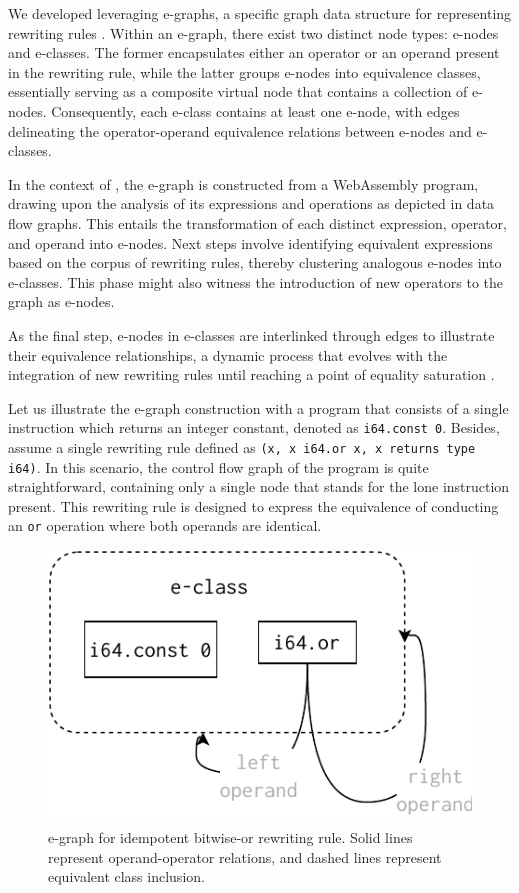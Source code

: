 \label{alg}

We developed \tool leveraging e-graphs, a specific graph data structure for representing rewriting rules \cite{10.1145/3571207}. 
Within an e-graph, there exist two distinct node types: e-nodes and e-classes. 
The former encapsulates either an operator or an operand present in the rewriting rule, while the latter groups e-nodes into equivalence classes, essentially serving as a composite virtual node that contains a collection of e-nodes. 
Consequently, each e-class contains at least one e-node, with edges delineating the operator-operand equivalence relations between e-nodes and e-classes.

In the context of \tool, the e-graph is constructed from a WebAssembly program, drawing upon the analysis of its expressions and operations as depicted in data flow graphs. 
This entails the transformation of each distinct expression, operator, and operand into e-nodes. 
Next steps involve identifying equivalent expressions based on the corpus of rewriting rules, thereby clustering analogous e-nodes into e-classes. 
This phase might also witness the introduction of new operators to the graph as e-nodes.

As the final step, e-nodes in e-classes are interlinked through edges to illustrate their equivalence relationships, a dynamic process that evolves with the integration of new rewriting rules until reaching a point of equality saturation \cite{10.1145/1480881.1480915}.

Let us illustrate the e-graph construction with a program that consists of a single instruction which returns an integer constant, denoted as \texttt{i64.const 0}. 
Besides, assume a single rewriting rule defined as \texttt{(x, x i64.or x, x returns type i64)}.
In this scenario, the control flow graph of the program is quite straightforward, containing only a single node that stands for the lone instruction present. 
This rewriting rule is designed to express the equivalence of conducting an \texttt{or} operation where both operands are identical.



\begin{figure}
  \centering
  \includegraphics[width=0.5\linewidth]{figures/egraph1.pdf}
  \caption{e-graph for idempotent bitwise-or rewriting rule. Solid lines represent operand-operator relations, and dashed lines represent equivalent class inclusion. }
\label{e-graph}
\end{figure}


